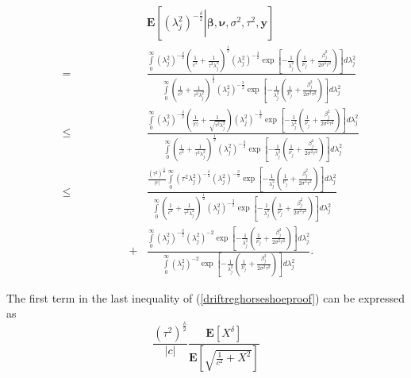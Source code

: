 \documentclass[noinfoline,11pt]{imsart}
\numberwithin{equation}{section}
\theoremstyle{plain}
\newcommand{\y}{\mathbf{y}}
\newcommand{\bb}{\boldsymbol{\beta}}
\newcommand{\E}{\boldsymbol{E}}
\begin{document}
\begin{eqnarray}\label{driftreghorseshoeproof}
& & \E\left[\left.\left(\lambda_j^2\right)^{-\frac{\delta}{2}}\right|\boldsymbol{\bb,\nu},\sigma^2,\tau^2,\y\right] \nonumber\\
&=& \frac{\int\limits_0^\infty\left(\lambda_j^2\right)^{-\frac{\delta}{2}}\left(\frac{1}{c^2}+\frac{1}{\tau^2\lambda_j^2}\right)^{\frac{1}{2}}\left(\lambda_j^2\right)^{-\frac{3}{2}}\exp{\left[-\frac{1}{\lambda_j^2}\left(\frac{1}{\nu_j}+\frac{\beta_j^2}{2\sigma^2\tau^2}\right)\right]}d\lambda_j^2}{\int\limits_0^\infty\left(\frac{1}{c^2}+\frac{1}{\tau^2\lambda_j^2}\right)^{\frac{1}{2}}\left(\lambda_j^2\right)^{-\frac{3}{2}}\exp{\left[-\frac{1}{\lambda_j^2}\left(\frac{1}{\nu_j}+\frac{\beta_j^2}{2\sigma^2\tau^2}\right)\right]}d\lambda_j^2}\nonumber \\
&\leq& \frac{\int\limits_0^\infty\left(\lambda_j^2\right)^{-\frac{\delta}{2}}\left(\frac{1}{|c|}+\frac{1}{\sqrt{\tau^2\lambda_j^2}}\right)\left(\lambda_j^2\right)^{-\frac{3}{2}}\exp{\left[-\frac{1}{\lambda_j^2}\left(\frac{1}{\nu_j}+\frac{\beta_j^2}{2\sigma^2\tau^2}\right)\right]}d\lambda_j^2}{\int\limits_0^\infty\left(\frac{1}{c^2}+\frac{1}{\tau^2\lambda_j^2}\right)^{\frac{1}{2}}\left(\lambda_j^2\right)^{-\frac{3}{2}}\exp{\left[-\frac{1}{\lambda_j^2}\left(\frac{1}{\nu_j}+\frac{\beta_j^2}{2\sigma^2\tau^2}\right)\right]}d\lambda_j^2}\nonumber \\
&\leq& \frac{\frac{\left(\tau^2\right)^{\frac{\delta}{2}}}{|c|}\int\limits_0^\infty\left(\tau^2\lambda_j^2\right)^{-\frac{\delta}{2}}\left(\lambda_j^2\right)^{-\frac{3}{2}}\exp{\left[-\frac{1}{\lambda_j^2}\left(\frac{1}{\nu_j}+\frac{\beta_j^2}{2\sigma^2\tau^2}\right)\right]}d\lambda_j^2}{\int\limits_0^\infty\left(\frac{1}{c^2}+\frac{1}{\tau^2\lambda_j^2}\right)^{\frac{1}{2}}\left(\lambda_j^2\right)^{-\frac{3}{2}}\exp{\left[-\frac{1}{\lambda_j^2}\left(\frac{1}{\nu_j}+\frac{\beta_j^2}{2\sigma^2\tau^2}\right)\right]}d\lambda_j^2}\nonumber \\
&\qquad \qquad \qquad +& \frac{\int\limits_0^\infty\left(\lambda_j^2\right)^{-\frac{\delta}{2}}\left(\lambda_j^2\right)^{-2}\exp{\left[-\frac{1}{\lambda_j^2}\left(\frac{1}{\nu_j}+\frac{\beta_j^2}{2\sigma^2\tau^2}\right)\right]}d\lambda_j^2}{\int\limits_0^\infty\left(\lambda_j^2\right)^{-2}\exp{\left[-\frac{1}{\lambda_j^2}\left(\frac{1}{\nu_j}+\frac{\beta_j^2}{2\sigma^2\tau^2}\right)\right]}d\lambda_j^2}. 
\end{eqnarray}

\noindent
The first term in the last inequality of (\ref{driftreghorseshoeproof}) can be expressed as 
$$
\frac{\left(\tau^2\right)^{\frac{\delta}{2}}}{|c|}\frac{\E\left[X^\delta\right]}{\E\left[\sqrt{\frac{1}{c^2}+X^2}\right]}
$$
\end{document}
